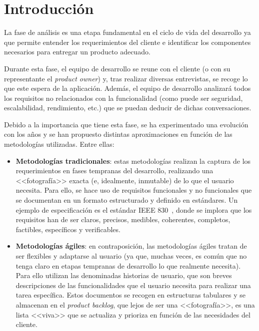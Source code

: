 
\section{Introducción}

La fase de análisis es una etapa fundamental en el ciclo de vida del desarrollo ya que permite entender los requerimientos del cliente e identificar los componentes necesarios para entregar un producto adecuado.

Durante esta fase, el equipo de desarrollo se reune con el cliente (o con su representante el \textit{product owner}) y, tras realizar diversas entrevistas, se recoge lo que este espera de la aplicación. Además, el equipo de desarrollo analizará todos los requisitos no relacionados con la funcionalidad (como puede ser seguridad, escalabilidad, rendimiento, etc.) que se puedan deducir de dichas conversaciones.

Debido a la importancia que tiene esta fase, se ha experimentado una evolución con los años y se han propuesto distintas aproximaciones en función de las metodologías utilizadas. Entre ellas:

\begin{itemize}
	\item \textbf{Metodologías tradicionales}: estas metodologías realizan la captura de los requerimientos en fases tempranas del desarrollo, realizando una <<fotografía>> exacta (e, idealmente, inmutable) de lo que el usuario necesita. Para ello, se hace uso de requisitos funcionales y no funcionales que se documentan en un formato estructurado y definido en estándares. Un ejemplo de especificación es el estándar IEEE 830~\cite{ieee830}, donde se implora que los requisitos han de ser claros, precisos, medibles, coherentes, completos, factibles, específicos y verificables.
	
	\item  \textbf{Metodologías ágiles}: en contraposición, las metodologías ágiles tratan de ser flexibles y adaptarse al usuario (ya que, muchas veces, es común que no tenga claro en etapas tempranas de desarrollo lo que realmente necesita). Para ello utilizan las denominadas historias de usuario, que son breves descripciones de las funcionalidades que el usuario necesita para realizar una tarea específica. Estos documentos se recogen en estructuras tabulares y se almacenan en el \textit{product backlog}, que lejos de ser una <<fotografía>>, es una lista <<viva>> que se actualiza y prioriza en función de las necesidades del cliente. 
\end{itemize}


